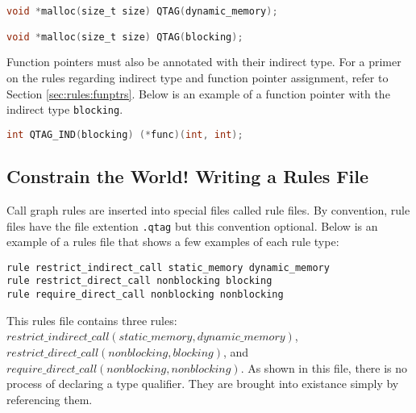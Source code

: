 \noindent\begin{minipage}[t]{\linewidth}
\begin{lstlisting}[language=C]
void *malloc(size_t size) QTAG(dynamic_memory);

void *malloc(size_t size) QTAG(blocking);
\end{lstlisting}
\end{minipage}

Function pointers must also be annotated with their indirect type.  For a primer on the rules regarding indirect type and function pointer assignment, refer to Section \ref{sec:rules:funptrs}.  Below is an example of a function pointer with the indirect type \lstinline{blocking}.

\noindent\begin{minipage}[t]{\linewidth}
\begin{lstlisting}[language=C++]
int QTAG_IND(blocking) (*func)(int, int);
\end{lstlisting}
\end{minipage}

\subsection{Constrain the World!  Writing a Rules File}\label{sec:operate:rules}

Call graph rules are inserted into special files called rule files.  By convention, rule files have the file extention \lstinline{.qtag} but this convention optional.  Below is an example of a rules file that shows a few examples of each rule type:

\noindent\begin{minipage}[t]{\linewidth}
\begin{lstlisting}
rule restrict_indirect_call static_memory dynamic_memory
rule restrict_direct_call nonblocking blocking
rule require_direct_call nonblocking nonblocking
\end{lstlisting}
\end{minipage}

\begin{sloppypar}
This rules file contains three rules: $restrict\_indirect\_call(static\_memory, dynamic\_memory)$, $restrict\_direct\_call(nonblocking, blocking)$, and $require\_direct\_call(nonblocking, nonblocking)$.  As shown in this file, there is no process of declaring a type qualifier.  They are brought into existance simply by referencing them.  
\end{sloppypar}

